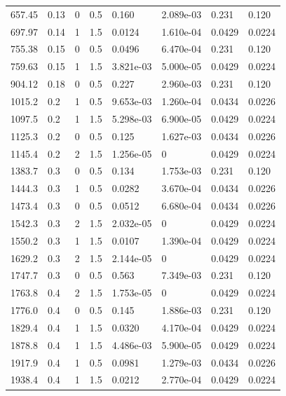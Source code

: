 \documentclass[preview]{standalone}
\begin{document}
{{\begin{tabular}{L{1.2cm}C{1.2cm} C{0.3cm}C{0.5cm} C{1.4cm}C{1.4cm} C{1.4cm}C{1.4cm}}
  657.45  &  0.13  & 0     & 0.5 &  0.160  & 2.089e-03  & 0.231 &  0.120   \\ 
  697.97  &  0.14  & 1     & 1.5 &  0.0124  & 1.610e-04  & 0.0429 &  0.0224   \\ 
  755.38  &  0.15  & 0     & 0.5 &  0.0496  & 6.470e-04  & 0.231 &  0.120   \\ 
  759.63  &  0.15  & 1     & 1.5 &  3.821e-03  & 5.000e-05  & 0.0429 &  0.0224   \\ 
  904.12  &  0.18  & 0     & 0.5 &  0.227  & 2.960e-03  & 0.231 &  0.120   \\ 
  1015.2  &   0.2  & 1     & 0.5 &  9.653e-03  & 1.260e-04  & 0.0434 &  0.0226   \\ 
  1097.5  &   0.2  & 1     & 1.5 &  5.298e-03  & 6.900e-05  & 0.0429 &  0.0224   \\ 
  1125.3  &   0.2  & 0     & 0.5 &  0.125  & 1.627e-03  & 0.0434 &  0.0226   \\ 
  1145.4  &   0.2  & 2     & 1.5 &  1.256e-05  & 0  & 0.0429 &  0.0224   \\ 
  1383.7  &   0.3  & 0     & 0.5 &  0.134  & 1.753e-03  & 0.231 &  0.120   \\ 
  1444.3  &   0.3  & 1     & 0.5 &  0.0282  & 3.670e-04  & 0.0434 &  0.0226   \\ 
  1473.4  &   0.3  & 0     & 0.5 &  0.0512  & 6.680e-04  & 0.0434 &  0.0226   \\ 
  1542.3  &   0.3  & 2     & 1.5 &  2.032e-05  & 0  & 0.0429 &  0.0224   \\ 
  1550.2  &   0.3  & 1     & 1.5 &  0.0107  & 1.390e-04  & 0.0429 &  0.0224   \\ 
  1629.2  &   0.3  & 2     & 1.5 &  2.144e-05  & 0  & 0.0429 &  0.0224   \\ 
  1747.7  &   0.3  & 0     & 0.5 &  0.563  & 7.349e-03  & 0.231 &  0.120   \\ 
  1763.8  &   0.4  & 2     & 1.5 &  1.753e-05  & 0  & 0.0429 &  0.0224   \\ 
  1776.0  &   0.4  & 0     & 0.5 &  0.145  & 1.886e-03  & 0.231 &  0.120   \\ 
  1829.4  &   0.4  & 1     & 1.5 &  0.0320  & 4.170e-04  & 0.0429 &  0.0224   \\ 
  1878.8  &   0.4  & 1     & 1.5 &  4.486e-03  & 5.900e-05  & 0.0429 &  0.0224   \\ 
  1917.9  &   0.4  & 1     & 0.5 &  0.0981  & 1.279e-03  & 0.0434 &  0.0226   \\ 
  1938.4  &   0.4  & 1     & 1.5 &  0.0212  & 2.770e-04  & 0.0429 &  0.0224   \\ 

\end{tabular}}}
\end{document}
